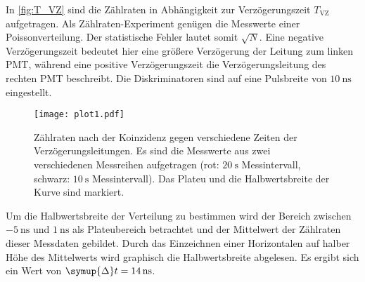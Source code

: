 In \autoref{fig:T_VZ} sind 
die Zählraten in Abhängigkeit zur Verzögerungszeit $T_\text{VZ}$ aufgetragen. Als Zählraten-Experiment genügen die Messwerte einer Poissonverteilung. Der statistische 
Fehler lautet somit $\sqrt{N}$. 
Eine negative Verzögerungszeit bedeutet hier eine größere Verzögerung der 
Leitung zum linken PMT, während eine positive Verzögerungszeit die Verzögerungsleitung des rechten PMT beschreibt. Die Diskriminatoren sind auf eine Pulsbreite 
von $\qty{10}{\nano\second}$ eingestellt. 
\begin{figure}[H]
  \centering
  \texttt{[image: plot1.pdf]}
  \caption{Zählraten nach der Koinzidenz gegen verschiedene Zeiten der Verzögerungsleitungen. Es sind die Messwerte aus zwei 
  verschiedenen Messreihen aufgetragen (rot: $\qty{20}{\second}$ Messintervall, schwarz: $\qty{10}{\second}$ Messintervall). Das Plateu und die Halbwertsbreite der Kurve sind markiert.}
  \label{fig:T_VZ}
\end{figure}
Um die Halbwertsbreite der Verteilung zu bestimmen wird der Bereich zwischen $\qty{-5}{\nano\second}$ und $\qty{1}{\nano\second}$ als Plateubereich betrachtet und 
der Mittelwert der Zählraten dieser Messdaten gebildet. Durch das Einzeichnen einer Horizontalen auf halber Höhe des Mittelwerts wird graphisch die Halbwertsbreite 
abgelesen. Es ergibt sich ein Wert von $\symup{\Delta}t = \qty{14}{\nano\second}$.

